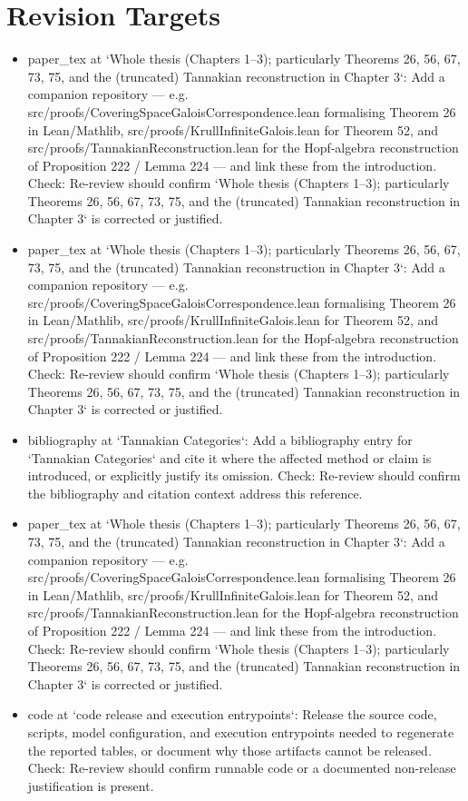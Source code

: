 \documentclass[11pt]{article}
\begin{document}
\section*{Revision Targets}
\begin{itemize}[leftmargin=*]
  \item [open] paper\_tex at `Whole thesis (Chapters 1--3); particularly Theorems 26, 56, 67, 73, 75, and the (truncated) Tannakian reconstruction in Chapter 3`: Add a companion repository --- e.g. src/proofs/CoveringSpaceGaloisCorrespondence.lean formalising Theorem 26 in Lean/Mathlib, src/proofs/KrullInfiniteGalois.lean for Theorem 52, and src/proofs/TannakianReconstruction.lean for the Hopf-algebra reconstruction of Proposition 222 / Lemma 224 --- and link these from the introduction. Check: Re-review should confirm `Whole thesis (Chapters 1--3); particularly Theorems 26, 56, 67, 73, 75, and the (truncated) Tannakian reconstruction in Chapter 3` is corrected or justified.
  \item [open] paper\_tex at `Whole thesis (Chapters 1--3); particularly Theorems 26, 56, 67, 73, 75, and the (truncated) Tannakian reconstruction in Chapter 3`: Add a companion repository --- e.g. src/proofs/CoveringSpaceGaloisCorrespondence.lean formalising Theorem 26 in Lean/Mathlib, src/proofs/KrullInfiniteGalois.lean for Theorem 52, and src/proofs/TannakianReconstruction.lean for the Hopf-algebra reconstruction of Proposition 222 / Lemma 224 --- and link these from the introduction. Check: Re-review should confirm `Whole thesis (Chapters 1--3); particularly Theorems 26, 56, 67, 73, 75, and the (truncated) Tannakian reconstruction in Chapter 3` is corrected or justified.
  \item [open] bibliography at `Tannakian Categories`: Add a bibliography entry for `Tannakian Categories` and cite it where the affected method or claim is introduced, or explicitly justify its omission. Check: Re-review should confirm the bibliography and citation context address this reference.
  \item [open] paper\_tex at `Whole thesis (Chapters 1--3); particularly Theorems 26, 56, 67, 73, 75, and the (truncated) Tannakian reconstruction in Chapter 3`: Add a companion repository --- e.g. src/proofs/CoveringSpaceGaloisCorrespondence.lean formalising Theorem 26 in Lean/Mathlib, src/proofs/KrullInfiniteGalois.lean for Theorem 52, and src/proofs/TannakianReconstruction.lean for the Hopf-algebra reconstruction of Proposition 222 / Lemma 224 --- and link these from the introduction. Check: Re-review should confirm `Whole thesis (Chapters 1--3); particularly Theorems 26, 56, 67, 73, 75, and the (truncated) Tannakian reconstruction in Chapter 3` is corrected or justified.
  \item [open] code at `code release and execution entrypoints`: Release the source code, scripts, model configuration, and execution entrypoints needed to regenerate the reported tables, or document why those artifacts cannot be released. Check: Re-review should confirm runnable code or a documented non-release justification is present.
\end{itemize}
\end{document}
